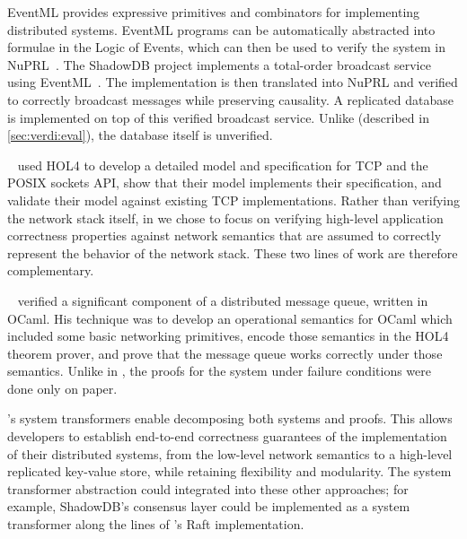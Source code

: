 \begin{sloppypar}
EventML \cite{rahli:eventml} provides expressive primitives and
combinators for implementing distributed systems.  EventML programs
can be automatically abstracted into formulae in the Logic of Events,
which can then be used to verify the system in
NuPRL~\cite{constable:nuprl}.  The ShadowDB project implements a
total-order broadcast service using
EventML~\cite{schiper:shadowdb}. The implementation is then translated
into NuPRL and verified to correctly broadcast messages while
preserving causality.  A replicated database is implemented on top of
this verified broadcast service.  Unlike \vard (described in
\cref{sec:verdi:eval}), the database itself is unverified.
\end{sloppypar}

\citeauthor{tcp-hol}~ used HOL4 to develop a detailed model and
specification for TCP and the POSIX sockets API, show that their model
implements their specification, and validate their model against
existing TCP implementations.  Rather than verifying the network stack
itself, in \Verdi we chose to focus on verifying high-level
application correctness properties against network semantics that are
assumed to correctly represent the behavior of the network
stack. These two lines of work are therefore complementary.

\citeauthor{ridge-2009}~ verified a
significant component of a distributed message queue, written in
OCaml. His technique was to develop an operational semantics for OCaml
which included some basic networking primitives, encode those
semantics in the HOL4 theorem prover, and prove that the message queue
works correctly under those semantics. Unlike in \Verdi, the proofs
for the system under failure conditions were done only on paper.

\Verdi's system transformers enable decomposing both systems and proofs.
This allows developers to establish end-to-end correctness guarantees of
the implementation of their distributed systems, from the low-level network
semantics to a high-level replicated key-value store, while retaining
flexibility and modularity. The system transformer abstraction could
integrated into these other approaches; for example, ShadowDB's consensus
layer could be implemented as a system transformer along the lines of
\Verdi's Raft implementation.


